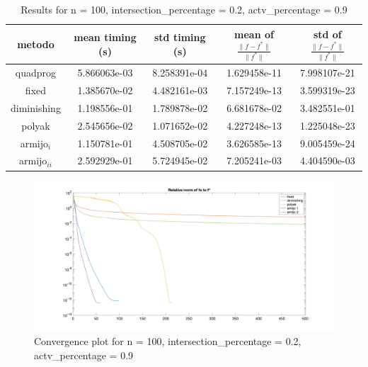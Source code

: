 
\begin{table}[H]
\setlength{\tabcolsep}{10pt} %
\renewcommand{\arraystretch}{1.2} %
\centering
\begin{tabular}{|ccccc|} 
\hline 
\multicolumn{1}{|c||}{metodo}   & \multicolumn{1}{c|}{mean timing (s)}    & \multicolumn{1}{c|}{std timing (s)} & \multicolumn{1}{c|}{mean of $\frac{\|f - f^*\|}{\|f^*\|}$}   & std of $\frac{\|f - f^*\|}{\|f^*\|}$ \\ \hline\hline 
\multicolumn{1}{|c||}{quadprog}       & \multicolumn{1}{c|}{5.866063e-03} & \multicolumn{1}{c|}{8.258391e-04}  & \multicolumn{1}{c|}{1.629458e-11} & 7.998107e-21  \\ \hline \hline
\multicolumn{1}{|c||}{fixed}       & \multicolumn{1}{c|}{1.385670e-02} & \multicolumn{1}{c|}{4.482161e-03}  & \multicolumn{1}{c|}{7.157249e-13} & 3.599319e-23  \\ \hline 
\multicolumn{1}{|c||}{diminishing}       & \multicolumn{1}{c|}{1.198556e-01} & \multicolumn{1}{c|}{1.789878e-02}  & \multicolumn{1}{c|}{6.681678e-02} & 3.482551e-01  \\ \hline 
\multicolumn{1}{|c||}{polyak}       & \multicolumn{1}{c|}{2.545656e-02} & \multicolumn{1}{c|}{1.071652e-02}  & \multicolumn{1}{c|}{4.227248e-13} & 1.225048e-23  \\ \hline 
\multicolumn{1}{|c||}{armijo$_{i}$}       & \multicolumn{1}{c|}{1.150781e-01} & \multicolumn{1}{c|}{4.508705e-02}  & \multicolumn{1}{c|}{3.626585e-13} & 9.005459e-24  \\ \hline 
\multicolumn{1}{|c||}{armijo$_{ii}$}       & \multicolumn{1}{c|}{2.592929e-01} & \multicolumn{1}{c|}{5.724945e-02}  & \multicolumn{1}{c|}{7.205241e-03} & 4.404590e-03  \\ \hline 
\end{tabular} 

\caption{Results for n = 100, intersection\_percentage = 0.2, actv\_percentage = 0.9}
\label{tab:100_zeronove_zerodue}
\end{table}


\begin{figure}[H]
\centering
    \includegraphics[width=20cm, center]{./plots/plot_100_zeronove_zerodue.png}
    \caption{Convergence plot for n = 100, intersection\_percentage = 0.2, actv\_percentage = 0.9}
    \label{fig:100_zeronove_zerodue}
\end{figure} 




